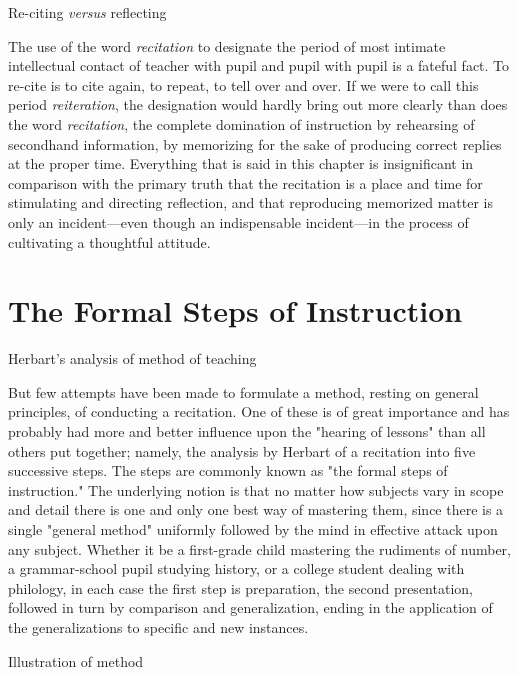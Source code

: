 \documentclass[letterpaper]{book}
\begin{document}
Re-citing \emph{versus} reflecting

The use of the word \emph{recitation} to designate the period of most
intimate intellectual contact of teacher with pupil and pupil with pupil
is a fateful fact. To re-cite is to cite again, to repeat, to tell over
and over. If we were to call this period \emph{reiteration}, the
designation would hardly bring out more clearly than does the word
\emph{recitation}, the complete domination of instruction by rehearsing
of secondhand information, by memorizing for the sake of producing
correct replies at the proper time. Everything that is said in this
chapter is insignificant in comparison with the primary truth that the
recitation is a place and time for stimulating and directing reflection,
and that reproducing
memorized
matter is only an incident---even though an indispensable incident---in
the process of cultivating a thoughtful attitude.

\section{The Formal Steps of Instruction}

Herbart's analysis of method of teaching

But few attempts have been made to formulate a method, resting on
general principles, of conducting a recitation. One of these is of great
importance and has probably had more and better influence upon the
"hearing of lessons" than all others put together; namely, the analysis
by Herbart of a recitation into five successive steps. The steps are
commonly known as "the formal steps of instruction." The underlying
notion is that no matter how subjects vary in scope and detail there is
one and only one best way of mastering them, since there is a single
"general method" uniformly followed by the mind in effective attack upon
any subject. Whether it be a first-grade child mastering the rudiments
of number, a grammar-school pupil studying history, or a college student
dealing with philology, in each case the first step is preparation, the
second presentation, followed in turn by comparison and generalization,
ending in the application of the generalizations to specific and new
instances.

Illustration of method
\end{document}
